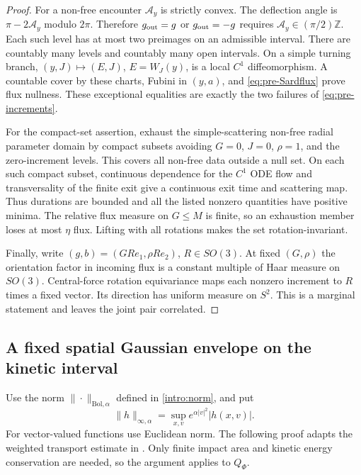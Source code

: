 \begin{proof}
For a non-free encounter $\mathcal A_y$ is strictly convex.
The deflection angle is $\pi-2\mathcal A_y$ modulo $2\pi$.
Therefore $g_{\rm out}=g$ or $g_{\rm out}=-g$ requires
$\mathcal A_y\in(\pi/2)\mathbb Z$.
Each such level has at most two preimages on an admissible interval.
There are countably many levels and countably many open intervals.
On a simple turning branch, $(y,J)\mapsto(E,J)$, $E=W_J(y)$,
is a local $C^1$ diffeomorphism.
A countable cover by these charts, Fubini in $(y,a)$, and
\eqref{eq:pre-Sardflux} prove flux nullness.
These exceptional equalities are exactly the two failures of
\eqref{eq:pre-increments}.

For the compact-set assertion, exhaust the simple-scattering non-free
radial parameter domain by compact subsets avoiding $G=0$, $J=0$,
$\rho=1$, and the zero-increment levels.
This covers all non-free data outside a null set.
On each such compact subset, continuous dependence for the $C^1$
ODE flow and transversality of the finite exit give a continuous
exit time and scattering map. Thus durations are bounded and all the
listed nonzero quantities have positive minima.
The relative flux measure on $G\leq M$ is finite, so an exhaustion
member loses at most $\eta$ flux. Lifting with all rotations makes
the set rotation-invariant.

Finally, write $(g,b)=(GRe_1,\rho Re_2)$, $R\in SO(3)$.
At fixed $(G,\rho)$ the orientation factor in incoming flux is a
constant multiple of Haar measure on $SO(3)$.
Central-force rotation equivariance maps each nonzero increment to
$R$ times a fixed vector. Its direction has uniform measure on $S^2$.
This is a marginal statement and leaves the joint pair correlated.
\end{proof}

\subsection{A fixed spatial Gaussian envelope on the kinetic interval}

Use the norm $\|\cdot\|_{\mathrm{Bol},\alpha}$ defined in
\eqref{intro:norm}, and put
\[
 \|h\|_{\infty,\alpha}
       =\sup_{x,v}e^{\alpha|v|^2}|h(x,v)|.
\]
For vector-valued functions use Euclidean norm.
The following proof adapts the weighted transport estimate in
\cite[Proposition A.1]{DHM25}. Only finite impact area and kinetic
energy conservation are needed, so the argument applies to $Q_\Phi$.

